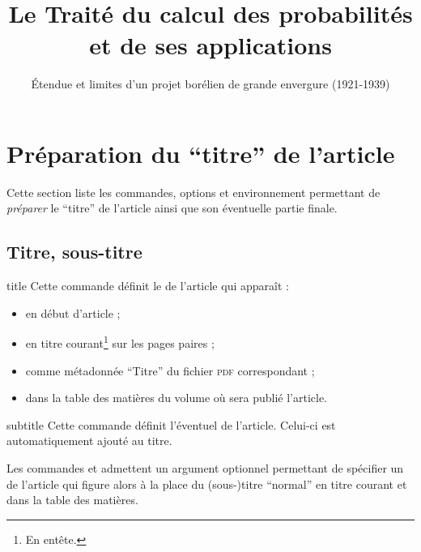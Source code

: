 \documentclass[french,nolocaltoc]{nwejmart}
\newtheorem[title=Fait,style=definition]{fact}
\begin{document}
\section{Préparation du \enquote{titre} de l'article}
\label{sec-prep-de-lart}

Cette section liste les commandes, options et environnement permettant de
\emph{préparer} le \enquote{titre} de l'article ainsi que son éventuelle partie
finale.

\subsection{Titre, sous-titre}
\label{sec-titre}

\begin{docCommand}[doc description=\mandatory]{title}{}
  Cette commande définit le  de l'article qui apparaît :
  \begin{itemize}
  \item en début d'article ;
  \item en titre courant\footnote{En entête.} sur les pages paires ;
  \item comme métadonnée \enquote{Titre} du fichier \textsc{pdf} correspondant ;
  \item dans la table des matières du volume où sera publié l'article.
  \end{itemize}
\end{docCommand}

\begin{docCommand}{subtitle}{}
  Cette commande définit l'éventuel  de l'article. Celui-ci
  est automatiquement ajouté au titre.
\end{docCommand}

Les commandes  et  admettent un argument
optionnel permettant de spécifier un  de l'article qui
figure alors à la place du (sous-)titre \enquote{normal} en titre courant et
dans la table des matières.

\begin{bodycode}[listing options={deletekeywords={title,subtitle}}]
\title[Le Traité du calcul des probabilités]{Le Traité du calcul des
  probabilités et de ses applications}
\subtitle[Étendue et limites d'un projet borélien]{Étendue et limites
  d'un projet borélien de grande envergure (1921-1939)}
\end{bodycode}
\end{document}
